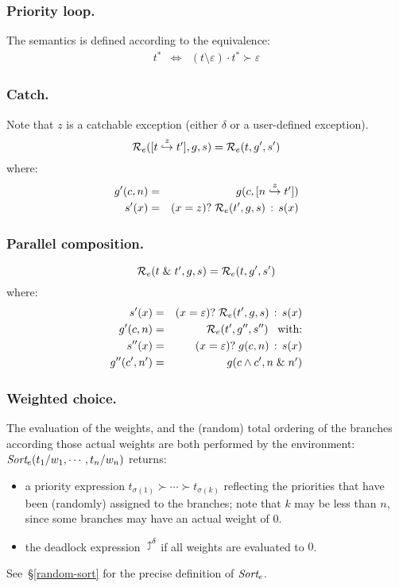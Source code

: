 \subsubsection{Priority loop.}

The semantics is defined according to the equivalence:
\begin{eqnarray*}
t^* & \Leftrightarrow & (t\setminus\varepsilon)\cdot t^* \succ \varepsilon
\end{eqnarray*}

\subsubsection{Catch.}
Note that $z$ is a catchable exception (either $\delta$ or a user-defined
exception).
\[
\mbox{${\cal R}_e$}(\mbox{$[t\stackrel{z}{\hookrightarrow}t']$}, g, s) = \mbox{${\cal R}_e$}(t, g', s')
\]
where:
\begin{eqnarray*}
g'(c,n) & = & g(c, \mbox{$[n\stackrel{z}{\hookrightarrow}t']$})\\
s'(x) & = & (x = z)?\;\mbox{${\cal R}_e$}(t', g, s)\,:\,s(x)
\end{eqnarray*}

\subsubsection{Parallel composition.}
\[
\mbox{${\cal R}_e$}(\mbox{$t\;\&\;t'$}, g, s) = \mbox{${\cal R}_e$}(t, g', s')
\]
where:
\begin{eqnarray*}
s'(x) & = & (x = \varepsilon)?\;\mbox{${\cal R}_e$}(t', g, s)\,:\,s(x)\\
g'(c,n) & = & \mbox{${\cal R}_e$}(t', g'', s'') \;\;\;\mbox{with:}\\
s''(x) & = & (x = \varepsilon)?\;g(c,n)\,:\,s(x)\\
g''(c',n') & = & g(c \wedge c', \mbox{$n\;\&\;n'$})
\end{eqnarray*}

\subsubsection{Weighted choice.}

\newcommand{\SORTE}{\mbox{$\mbox{\it Sort}_e$}}

The evaluation of the weights, and the (random) total ordering
of the branches according those actual weights are both 
performed by the environment:\\
$\SORTE(t_1/w_1, \cdots, t_n/w_n)$ returns:
\begin{itemize}
\item a priority expression $t_{\sigma(1)} \succ \cdots \succ t_{\sigma(k)}$ 
reflecting the priorities that have been (randomly) assigned 
to the branches; note that $k$ may be less than $n$, since some branches may have
an actual weight of $0$.  
\item the deadlock expression $\diewith{\delta}$ if all weights
are evaluated to $0$.
\end{itemize}
See~\S\ref{random-sort} for the precise definition of \SORTE.

